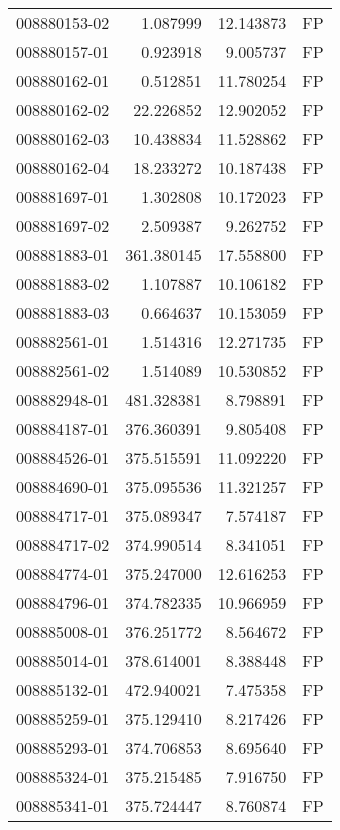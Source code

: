 \begin{tabular}{lrrl}
008880153-02 &    1.087999 &      12.143873 &   FP \\
008880157-01 &    0.923918 &       9.005737 &   FP \\
008880162-01 &    0.512851 &      11.780254 &   FP \\
008880162-02 &   22.226852 &      12.902052 &   FP \\
008880162-03 &   10.438834 &      11.528862 &   FP \\
008880162-04 &   18.233272 &      10.187438 &   FP \\
008881697-01 &    1.302808 &      10.172023 &   FP \\
008881697-02 &    2.509387 &       9.262752 &   FP \\
008881883-01 &  361.380145 &      17.558800 &   FP \\
008881883-02 &    1.107887 &      10.106182 &   FP \\
008881883-03 &    0.664637 &      10.153059 &   FP \\
008882561-01 &    1.514316 &      12.271735 &   FP \\
008882561-02 &    1.514089 &      10.530852 &   FP \\
008882948-01 &  481.328381 &       8.798891 &   FP \\
008884187-01 &  376.360391 &       9.805408 &   FP \\
008884526-01 &  375.515591 &      11.092220 &   FP \\
008884690-01 &  375.095536 &      11.321257 &   FP \\
008884717-01 &  375.089347 &       7.574187 &   FP \\
008884717-02 &  374.990514 &       8.341051 &   FP \\
008884774-01 &  375.247000 &      12.616253 &   FP \\
008884796-01 &  374.782335 &      10.966959 &   FP \\
008885008-01 &  376.251772 &       8.564672 &   FP \\
008885014-01 &  378.614001 &       8.388448 &   FP \\
008885132-01 &  472.940021 &       7.475358 &   FP \\
008885259-01 &  375.129410 &       8.217426 &   FP \\
008885293-01 &  374.706853 &       8.695640 &   FP \\
008885324-01 &  375.215485 &       7.916750 &   FP \\
008885341-01 &  375.724447 &       8.760874 &   FP \\

\end{tabular}
